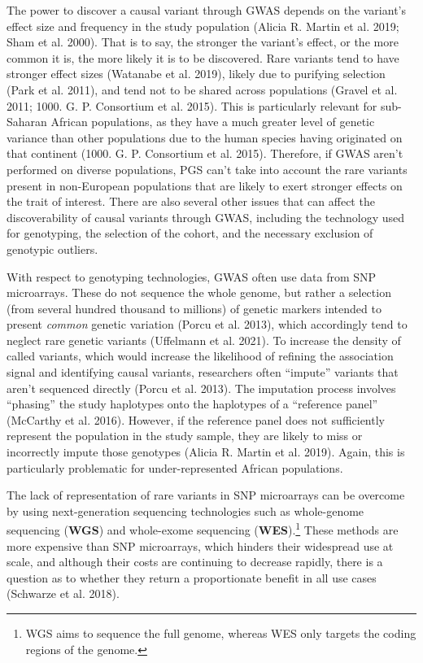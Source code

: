 \documentclass[
]{book}
\begin{document}
The power to discover a causal variant through GWAS depends on the variant's effect size and frequency in the study population (Alicia R. Martin et al. 2019; Sham et al. 2000). That is to say, the stronger the variant's effect, or the more common it is, the more likely it is to be discovered. Rare variants tend to have stronger effect sizes (Watanabe et al. 2019), likely due to purifying selection (Park et al. 2011), and tend not to be shared across populations (Gravel et al. 2011; 1000. G. P. Consortium et al. 2015). This is particularly relevant for sub-Saharan African populations, as they have a much greater level of genetic variance than other populations due to the human species having originated on that continent (1000. G. P. Consortium et al. 2015). Therefore, if GWAS aren't performed on diverse populations, PGS can't take into account the rare variants present in non-European populations that are likely to exert stronger effects on the trait of interest. There are also several other issues that can affect the discoverability of causal variants through GWAS, including the technology used for genotyping, the selection of the cohort, and the necessary exclusion of genotypic outliers.

With respect to genotyping technologies, GWAS often use data from SNP microarrays. These do not sequence the whole genome, but rather a selection (from several hundred thousand to millions) of genetic markers intended to present \emph{common} genetic variation (Porcu et al. 2013), which accordingly tend to neglect rare genetic variants (Uffelmann et al. 2021). To increase the density of called variants, which would increase the likelihood of refining the association signal and identifying causal variants, researchers often ``impute'' variants that aren't sequenced directly (Porcu et al. 2013). The imputation process involves ``phasing'' the study haplotypes onto the haplotypes of a ``reference panel'' (McCarthy et al. 2016). However, if the reference panel does not sufficiently represent the population in the study sample, they are likely to miss or incorrectly impute those genotypes (Alicia R. Martin et al. 2019). Again, this is particularly problematic for under-represented African populations.

The lack of representation of rare variants in SNP microarrays can be overcome by using next-generation sequencing technologies such as whole-genome sequencing (\textbf{WGS}) and whole-exome sequencing (\textbf{WES}).\footnote{WGS aims to sequence the full genome, whereas WES only targets the coding regions of the genome.} These methods are more expensive than SNP microarrays, which hinders their widespread use at scale, and although their costs are continuing to decrease rapidly, there is a question as to whether they return a proportionate benefit in all use cases (Schwarze et al. 2018).
\end{document}
